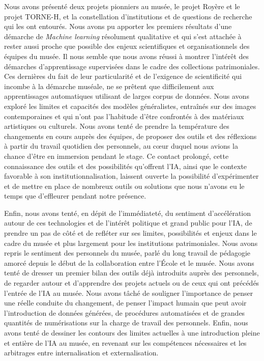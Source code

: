 Nous avons présenté deux projets pionniers au musée, le projet Royère et le projet TORNE-H, et la constellation d'institutions et de questions de recherche qui les ont entourés. Nous avons pu apporter les premiers résultats d'une démarche de \textit{Machine learning} résolument qualitative et qui s'est attachée à rester aussi proche que possible des enjeux scientifiques et organisationnels des équipes du musée. Il nous semble que nous avons réussi à montrer l'intérêt des démarches d'apprentissage supervisées dans le cadre des collections patrimoniales. Ces dernières du fait de leur particularité et de l'exigence de scientificité qui incombe à la démarche muséale, ne se prêtent que difficilement aux apprentissages automatiques utilisant de larges corpus de données. Nous avons exploré les limites et capacités des modèles généralistes, entraînés sur des images contemporaines et qui n'ont pas l'habitude d'être confrontés à des matériaux artistiques ou culturels. Nous avons tenté de prendre la température des changements en cours auprès des équipes, de proposer des outils et des réflexions à partir du travail quotidien des personnels, au cœur duquel nous avions la chance d'être en immersion pendant le stage. Ce contact prolongé, cette connaissance des outils et des possibilités qu'offrent l'IA, ainsi que le contexte favorable à son institutionnalisation, laissent ouverte la possibilité d'expérimenter et de mettre en place de nombreux outils ou solutions que nous n'avons eu le temps que d’effleurer pendant notre présence.

Enfin, nous avons tenté, en dépit de l'immédiateté, du sentiment d'accélération autour de ces technologies et de l'intérêt politique et grand public pour l'IA, de prendre un pas de côté et de refléter sur ses limites, possibilités et enjeux dans le cadre du musée et plus largement pour les institutions patrimoniales. Nous avons repris le sentiment des personnels du musée, parlé du long travail de pédagogie amorcé depuis le début de la collaboration entre l'École et le musée. Nous avons tenté de dresser un premier bilan des outils déjà introduits auprès des personnels, de regarder autour et d'apprendre des projets actuels ou de ceux qui ont précédés l'entrée de l'IA au musée. Nous avons tâché de souligner l'importance de penser une réelle conduite du changement, de penser l'impact humain que peut avoir l'introduction de données générées, de procédures automatisées et de grandes quantités de numérisations sur la charge de travail des personnels. Enfin, nous avons tenté de dessiner les contours des limites actuelles à une introduction pleine et entière de l'IA au musée, en revenant sur les compétences nécessaires et les arbitrages entre internalisation et externalisation.\\[0,5cm]

